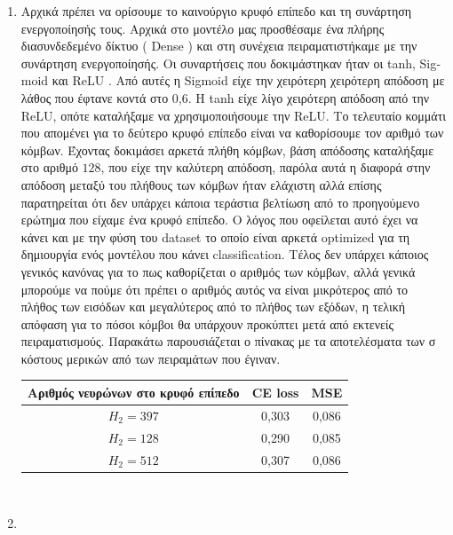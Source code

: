 \documentclass[12pt,a4paper]{article}
\newcommand{\tl}{\textlatin}
\begin{document}
\begin{enumerate}[a]
        \item Αρχικά πρέπει να ορίσουμε το καινούργιο κρυφό επίπεδο και τη συνάρτηση ενεργοποίησής τους. Αρχικά στο μοντέλο μας προσθέσαμε ένα πλήρης διασυνδεδεμένο δίκτυο ( \tl{Dense} ) και στη συνέχεια πειραματιστήκαμε με την συνάρτηση ενεργοποίησής. Οι συναρτήσεις που δοκιμάστηκαν ήταν οι \tl{tanh, Sigmoid} και \tl{ReLU }. Από αυτές η \tl{Sigmoid} είχε την χειρότερη χειρότερη απόδοση με λάθος που έφτανε κοντά στο 0,6. Η \tl{tanh} είχε λίγο χειρότερη απόδοση από την \tl{ReLU}, οπότε καταλήξαμε να χρησιμοποιήσουμε την \tl{ReLU}. Το τελευταίο κομμάτι που απομένει για το δεύτερο κρυφό επίπεδο είναι να καθορίσουμε τον αριθμό των κόμβων. Έχοντας δοκιμάσει αρκετά πλήθη κόμβων, βάση απόδοσης καταλήξαμε στο αριθμό $128$, που είχε την καλύτερη απόδοση, παρόλα αυτά η διαφορά στην απόδοση μεταξύ του πλήθους των κόμβων ήταν ελάχιστη αλλά επίσης παρατηρείται ότι δεν υπάρχει κάποια τεράστια βελτίωση από το προηγούμενο ερώτημα που είχαμε ένα κρυφό επίπεδο. Ο λόγος που οφείλεται αυτό έχει να κάνει και με την φύση του \tl{dataset} το οποίο είναι αρκετά \tl{optimized} για τη δημιουργία ενός μοντέλου που κάνει \tl{classification}. Τέλος δεν υπάρχει κάποιος γενικός κανόνας για το πως καθορίζεται ο αριθμός των κόμβων, αλλά γενικά μπορούμε να πούμε ότι πρέπει ο αριθμός αυτός να είναι μικρότερος από το πλήθος των εισόδων και μεγαλύτερος από το πλήθος των εξόδων, η τελική απόφαση για το πόσοι κόμβοι θα υπάρχουν προκύπτει μετά από εκτενείς πειραματισμούς. Παρακάτω παρουσιάζεται ο πίνακας με τα αποτελέσματα των σ κόστους μερικών από των πειραμάτων που έγιναν. \\ 

            \begin{tabular}{|c | c | c | }
                \hline
                Αριθμός νευρώνων στο κρυφό επίπεδο & \tl{CE loss} & \tl{MSE} \\
                \hline
                $H_2 = 397$ & 0,303 & 0,086 \\ 
                $H_2 = 128$ & 0,290 & 0,085 \\ 
                $H_2 = 512$ & 0,307 & 0,086 \\
                \hline 
            \end{tabular} \\
        \item 

    \end{enumerate}
\end{document}
